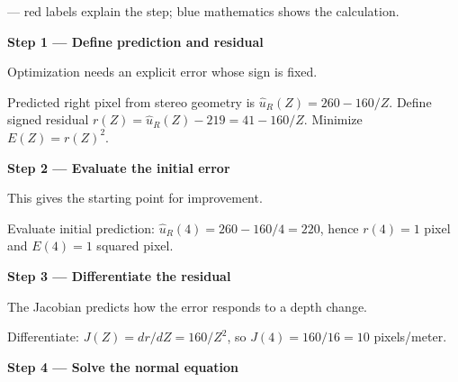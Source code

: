 \documentclass[letterpaper,11pt,english,openany,oneside]{jupyterBook}
\begin{document}
\par\medskip

\sphinxAtStartPar
{} — red labels explain the step; blue mathematics shows the calculation.

\par\medskip{}
{\color{QuizStepRed}\bfseries Step 1 — Define prediction and residual}\par\smallskip

\sphinxAtStartPar
{} Optimization needs an explicit error whose sign is fixed.

\sphinxAtStartPar
Predicted right pixel from stereo geometry is {\color{QuizMathBlue} \(\widehat u_R(Z)=260-160/Z\)}. Define signed residual {\color{QuizMathBlue} \(r(Z)=\widehat u_R(Z)-219=41-160/Z\)}. Minimize {\color{QuizMathBlue} \(E(Z)=r(Z)^2\)}.

\par

\par\medskip{}
{\color{QuizStepRed}\bfseries Step 2 — Evaluate the initial error}\par\smallskip

\sphinxAtStartPar
{} This gives the starting point for improvement.

\sphinxAtStartPar
Evaluate initial prediction: {\color{QuizMathBlue} \(\widehat u_R(4)=260-160/4=220\)}, hence {\color{QuizMathBlue} \(r(4)=1\)} pixel and {\color{QuizMathBlue} \(E(4)=1\)} squared pixel.

\par

\par\medskip{}
{\color{QuizStepRed}\bfseries Step 3 — Differentiate the residual}\par\smallskip

\sphinxAtStartPar
{} The Jacobian predicts how the error responds to a depth change.

\sphinxAtStartPar
Differentiate: {\color{QuizMathBlue} \(J(Z)=dr/dZ=160/Z^2\)}, so {\color{QuizMathBlue} \(J(4)=160/16=10\)} pixels/meter.

\par

\par\medskip{}
{\color{QuizStepRed}\bfseries Step 4 — Solve the normal equation}\par\smallskip
\end{document}
